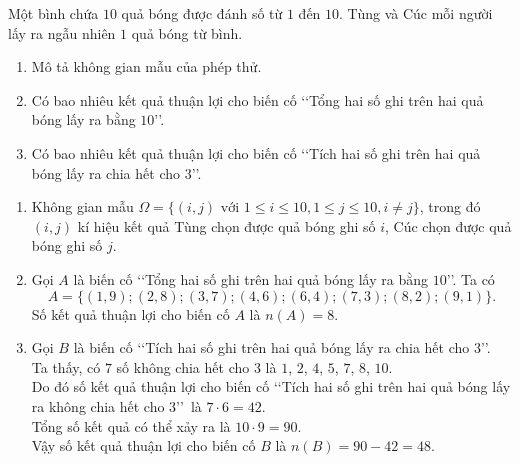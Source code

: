 \begin{bt}%
	Một bình chứa $10$ quả bóng được đánh số từ $1$ đến $10$. Tùng và Cúc mỗi người lấy ra ngẫu nhiên $1$ quả bóng từ bình.
	\begin{enumerate}
		\item Mô tả không gian mẫu của phép thử.
		\item Có bao nhiêu kết quả thuận lợi cho biến cố \lq\lq  Tổng hai số ghi trên hai quả bóng lấy ra bằng $10$\rq\rq.
		\item Có bao nhiêu kết quả thuận lợi cho biến cố \lq\lq  Tích hai số ghi trên hai quả bóng lấy ra chia hết cho $3$\rq\rq.
	\end{enumerate}
	\loigiai
	{
		\begin{enumerate}
			\item Không gian mẫu $\Omega= \{(i, j) \text{ với } 1\le i\le 10, 1\le j\le 10, i\neq j\}$, trong đó $(i, j)$ kí hiệu kết quả Tùng chọn được quả bóng ghi số $i$, Cúc chọn được quả bóng ghi số $j$.
			\item Gọi $A$ là biến cố \lq\lq  Tổng hai số ghi trên hai quả bóng lấy ra bằng $10$\rq\rq. Ta có
			\[
			A=\{(1,9); (2,8); (3,7); (4,6); (6,4); (7,3); (8,2); (9,1)\}.
			\]
			Số kết quả thuận lợi cho biến cố $A$ là $n(A)=8$.
			\item Gọi $B$ là biến cố \lq\lq  Tích hai số ghi trên hai quả bóng lấy ra chia hết cho $3$\rq\rq.\\
			Ta thấy, có $7$ số không chia hết cho $3$ là $1$, $2$, $4$, $5$, $7$, $8$, $10$.\\
			Do đó số kết quả thuận lợi cho biến cố \lq\lq  Tích hai số ghi trên hai quả bóng lấy ra không chia hết cho $3$\rq\rq\ là $7\cdot 6=42$.\\
			Tổng số kết quả có thể xảy ra là $10\cdot 9=90$.\\
			Vậy số kết quả thuận lợi cho biến cố $B$ là $n(B)= 90-42=48$.
		\end{enumerate}
	}
\end{bt}

